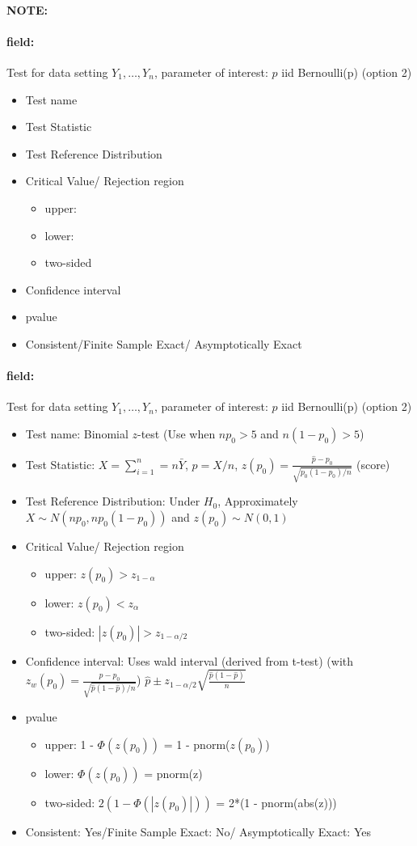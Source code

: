 \documentclass[12pt]{article}
\newenvironment{note}{\paragraph{NOTE:}}{}
\newenvironment{field}{\paragraph{field:}}{}
\begin{document}
\begin{note}
 \begin{field}
  Test for data setting $Y_1, \ldots, Y_n$, parameter of interest: $p$ iid Bernoulli(p) (option 2)
  \begin{itemize}
   \item Test name
   \item Test Statistic
   \item Test Reference Distribution
   \item Critical Value/ Rejection region
         \begin{itemize}
          \item upper:
          \item lower:
          \item two-sided
         \end{itemize}
   \item Confidence interval
   \item pvalue
   \item Consistent/Finite Sample Exact/ Asymptotically Exact
  \end{itemize}
 \end{field}
 \begin{field}
  Test for data setting $Y_1, \ldots, Y_n$, parameter of interest: $p$ iid Bernoulli(p) (option 2)
  \begin{itemize}
   \item Test name: Binomial $z$-test (Use when $np_0 > 5$ and $n(1-p_0) > 5$)
   \item Test Statistic: $X  = \sum_{i=1}^n = n\bar{Y}$, $\hat{p} = X/n$, $z(p_0) = \frac{\hat{p}- p_0}{\sqrt{p_0(1-p_0)/n}}$ (score)
   \item Test Reference Distribution: Under $H_0$, Approximately $X \sim N(np_0,np_0(1-p_0))$ and $z(p_0) \sim N(0,1)$
   \item Critical Value/ Rejection region
         \begin{itemize}
          \item upper: $z(p_0) > z_{1-\alpha}$
          \item lower: $z(p_0) < z_\alpha$
          \item two-sided: $|z(p_0)| > z_{1-\alpha/2}$
         \end{itemize}
   \item Confidence interval: Uses wald interval (derived from t-test) (with $z_w(p_0) = \frac{\hat{p} - p_0}{\sqrt{\hat{p}(1 - \hat{p})/n}}$) $\hat{p} \pm z_{1-\alpha/2}\sqrt{\frac{\hat{p}(1 - \hat{p})}{n}}$
   \item pvalue
         \begin{itemize}
          \item upper: 1 - $\Phi(z(p_0))$ = 1 - pnorm($z(p_0)$)
          \item lower: $\Phi(z(p_0))$ = pnorm(z)
          \item two-sided: $2(1 - \Phi(|z(p_0)|))$ = 2*(1 - pnorm(abs(z)))
         \end{itemize}
   \item Consistent: Yes/Finite Sample Exact: No/ Asymptotically Exact: Yes
  \end{itemize}
 \end{field}
\end{note}
\end{document}
